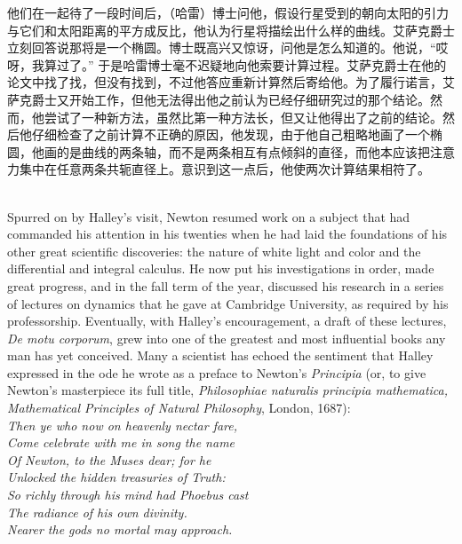 \documentclass{article}
\begin{document}
\addtolength{\leftskip}{1cm}
他们在一起待了一段时间后，（哈雷）博士问他，假设行星受到的朝向太阳的引力与它们和太阳距离的平方成反比，他认为行星将描绘出什么样的曲线。艾萨克爵士立刻回答说那将是一个椭圆。博士既高兴又惊讶，问他是怎么知道的。他说，“哎呀，我算过了。” 于是哈雷博士毫不迟疑地向他索要计算过程。艾萨克爵士在他的论文中找了找，但没有找到，不过他答应重新计算然后寄给他。为了履行诺言，艾萨克爵士又开始工作，但他无法得出他之前认为已经仔细研究过的那个结论。然而，他尝试了一种新方法，虽然比第一种方法长，但又让他得出了之前的结论。然后他仔细检查了之前计算不正确的原因，他发现，由于他自己粗略地画了一个椭圆，他画的是曲线的两条轴，而不是两条相互有点倾斜的直径，而他本应该把注意力集中在任意两条共轭直径上。意识到这一点后，他使两次计算结果相符了。 \\

\addtolength{\leftskip}{-1cm}

\\
Spurred on by Halley’s visit, Newton resumed work on a subject that had commanded his attention in his twenties when he had laid the foundations of his other great scientific discoveries: the nature of white light and color and the differential and integral calculus. He now put his investigations in order, made great progress, and in the fall term of the year, discussed his research in a series of lectures on dynamics that he gave at Cambridge University, as required by his professorship. Eventually, with Halley’s encouragement, a draft of these lectures, \textit{De motu corporum}, grew into one of the greatest and most influential books any man has yet conceived. Many a scientist has echoed the sentiment that Halley expressed in the ode he wrote as a preface to Newton’s \textit{Principia} (or, to give Newton’s masterpiece its full title, \textit{Philosophiae naturalis principia mathematica, Mathematical Principles of Natural Philosophy}, London, 1687):\\

\addtolength{\leftskip}{1cm}
\noindent\textit{
Then ye who now on heavenly nectar fare,\\
Come celebrate with me in song the name\\
Of Newton, to the Muses dear; for he\\
Unlocked the hidden treasuries of Truth:\\
So richly through his mind had Phoebus cast\\
The radiance of his own divinity.\\
Nearer the gods no mortal may approach.\\}
\end{document}
